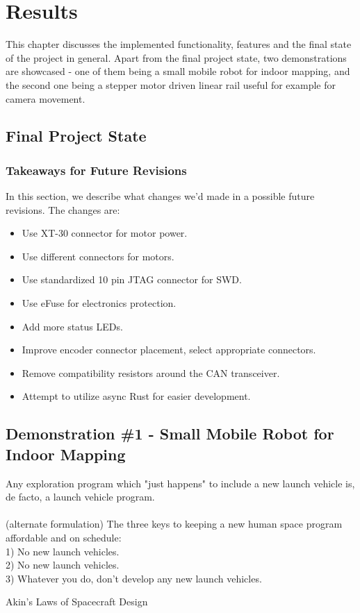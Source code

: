 \chapter{Results}
\label{ch:results}
This chapter discusses the implemented functionality, features and the final state of the project in general.
Apart from the final project state, two demonstrations are showcased - one of them being a small mobile robot for indoor mapping, and the second one being a stepper motor driven linear rail useful for example for camera movement.

\section{Final Project State}
\label{sec:final_project_state}

\subsection{Takeaways for Future Revisions}
\label{subsec:final_takeaways}
In this section, we describe what changes we'd made in a possible future revisions.
The changes are:
\begin{itemize}
    \item Use XT-30 connector for motor power.
    \item Use different connectors for motors.
    \item Use standardized 10 pin JTAG connector for SWD.
    \item Use eFuse for electronics protection.
    \item Add more status LEDs.
    \item Improve encoder connector placement, select appropriate connectors.
    \item Remove compatibility resistors around the CAN transceiver.
    \item Attempt to utilize async Rust for easier development.
\end{itemize}

\section{Demonstration \#1 - Small Mobile Robot for Indoor Mapping}
\label{sec:dem1}
\epigraph{
    Any exploration program which "just happens" to include a new launch vehicle is, de facto, a launch vehicle program. \\ \\
    (alternate formulation) The three keys to keeping a new human space program affordable and on schedule: \\
1)  No new launch vehicles. \\
2)  No new launch vehicles. \\
3)  Whatever you do, don't develop any new launch vehicles.}{Akin's Laws of Spacecraft Design\cite{david_l_akin_akins_nodate}}

